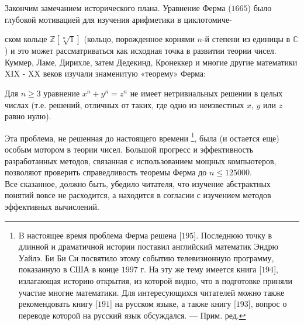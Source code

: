 Закончим замечанием исторического плана. Уравнение Ферма ($1665$)
было глубокой мотивацией для изучения арифметики в циклотомиче-

\noindent ском кольце $\mathbb{Z}[\sqrt[n]1]$ (кольцо, порожденное корнями $n$-й степени из единицы в $\mathbb{C}$) и это может рассматриваться как исходная точка в развитии теории чисел. Куммер, Ламе, Дирихле, затем Дедекинд, Кронеккер и многие другие математики XIX - XX веков изучали знаменитую «теорему» Ферма:
\\

\begin{thm}
Для $n \ge 3$ уравнение $x^n + y^n = z^n$ не имеет нетривиальных 
решении в целых числах (т.е. решений, отличных от таких, где одно из
неизвестных $x$, $y$ или $z$ равно нулю).
\end{thm}

Эта проблема, не решенная до настоящего времени \footnote{B настоящее время проблема Ферма решена [$195$]. Последнюю точку в длинной
и драматичной истории поставил английский математик Эндрю Уайлэ. Би Би Си
посвятило этому событию телевизионную программу, показанную в США в конце
$1997$ г. На эту же тему имеется книга [$194$], излагающая историю открытия, из которой видно, что в подготовке приняли участие многие математики. Для 
интересующихся читателей можно также рекомендовать книгу [$191$] на русском языке, а также книгу [$193$], вопрос о переводе которой на русский язык обсуждался. — Прим. ред.}, была (и 
остается еще) особым мотором в теории чисел. Большой прогресс и 
эффективность разработанных методов, связанная с использованием мощных
компьютеров, позволяют проверить справедливость теоремы Ферма до
$n \le 125000$.
\\

Все сказанное, должно быть, убедило читателя, что изучение
абстрактных понятий вовсе не расходится, а находится в согласии с
изучением методов эффективных вычислений.
\\

\newpage


